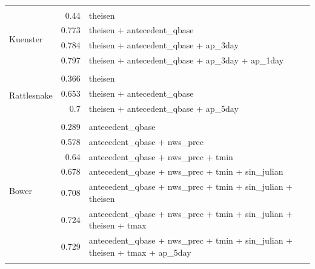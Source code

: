 \documentclass[10pt]{article}
\begin{document}
\begin{table}[h]
\begin{center}
\begin{tabular}{lrl}
\vspace{2mm}\\ \multirow{5}{*}{Kuenster} & 0.44 & theisen\\ 
 & 0.773 & theisen + antecedent\_qbase\\ 
 & 0.784 & theisen + antecedent\_qbase + ap\_3day\\ 
 & 0.797 & theisen + antecedent\_qbase + ap\_3day + ap\_1day\\ 
\vspace{2mm}\\ \multirow{4}{*}{Rattlesnake} & 0.366 & theisen\\ 
 & 0.653 & theisen + antecedent\_qbase\\ 
 & 0.7 & theisen + antecedent\_qbase + ap\_5day\\ 
\vspace{2mm}\\ \multirow{8}{*}{Bower} & 0.289 & antecedent\_qbase\\ 
 & 0.578 & antecedent\_qbase + nws\_prec\\ 
 & 0.64 & antecedent\_qbase + nws\_prec + tmin\\ 
 & 0.678 & antecedent\_qbase + nws\_prec + tmin + sin\_julian\\ 
 & 0.708 & antecedent\_qbase + nws\_prec + tmin + sin\_julian + theisen\\ 
 & 0.724 & antecedent\_qbase + nws\_prec + tmin + sin\_julian + theisen + tmax\\ 
 & 0.729 & antecedent\_qbase + nws\_prec + tmin + sin\_julian + theisen + tmax + ap\_5day\\ 
\vspace{2mm}\\     \end{tabular}
    \caption{\label{phos_r_square_nosnow}}
    \end{center}
\end{table}
\end{document}

